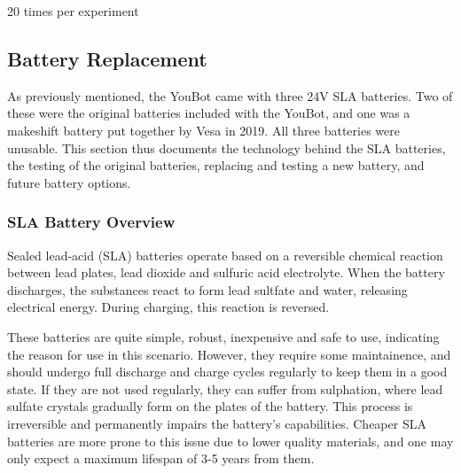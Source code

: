 \documentclass[a4paper, 12pt]{article}
\newif\ifshownotes
\newcommand{\notes}[1]{\ifshownotes\textcolor{blue}{#1}\fi}
\begin{document}
    \notes{different speeds? proportional or fixed error? does the odometry also drift?}

    20 times per experiment
    
    
    \pagebreak



    \subsection{Battery Replacement}



    \notes{draft 1, 11.05 12pm\\
    Here are some good web pages about the Slealed Lead Acid (SLA) batteries:
https://batterymasters.co.uk/blog/post/How%
and
https://www.power-sonic.com/blog/how-to-charge-a-lead-acid-battery/
and
https://www.powerstream.com/SLA.htm}

    As previously mentioned, the YouBot came with three 24V SLA batteries. Two of these were the original batteries included with the YouBot, and one was a makeshift battery put together by Vesa in 2019. All three batteries were unusable. This section thus documents the technology behind the SLA batteries, the testing of the original batteries, replacing and testing a new battery, and future battery options. 

    \subsubsection{SLA Battery Overview}

    Sealed lead-acid (SLA) batteries operate based on a reversible chemical reaction between lead plates, lead dioxide and sulfuric acid electrolyte. When the battery discharges, the substances react to form lead sultfate and water, releasing electrical energy. During charging, this reaction is reversed.

    These batteries are quite simple, robust, inexpensive and safe to use, indicating the reason for use in this scenario. However, they require some maintainence, and should undergo full discharge and charge cycles regularly to keep them in a good state. If they are not used regularly, they can suffer from sulphation, where lead sulfate crystals gradually form on the plates of the battery. This process is irreversible and permanently impairs the battery's capabilities. Cheaper SLA batteries are more prone to this issue due to lower quality materials, and one may only expect a maximum lifespan of 3-5 years from them. 
\end{document}
